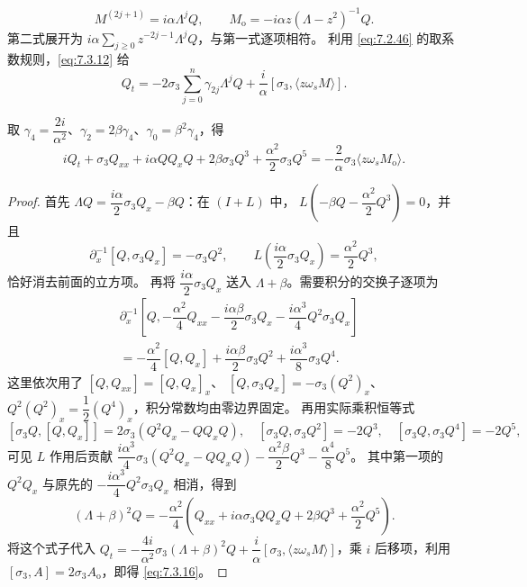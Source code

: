 \documentclass[lang=cn,scheme=chinese,mode=simple,device=normal,color=blue,math=cm,thmcnt=section,12pt]{elegantbook}
\newcommand{\eqq}[2]{\tag{#1}\label{eq:#1}#2}
\begin{document}
\begin{equation}
\eqq{7.3.15}{M^{(2j+1)}=i\alpha\Lambda^jQ,\qquad M_{\mathrm o}=-i\alpha z(\Lambda-z^2)^{-1}Q.}
\end{equation}
第二式展开为 $i\alpha\displaystyle\sum\limits_{j\ge0}z^{-2j-1}\Lambda^jQ$，与第一式逐项相符。
利用 \eqref{eq:7.2.46} 的取系数规则，\eqref{eq:7.3.12} 给
\[
Q_t=-2\sigma_3\sum\limits_{j=0}^n\gamma_{2j}\Lambda^jQ+\dfrac{i}{\alpha}[\sigma_3,\langle z\omega_sM\rangle].
\]
\setcounter{exam}{1}
\begin{example}
取 $\gamma_4=\dfrac{2i}{\alpha^2}$、$\gamma_2=2\beta\gamma_4$、$\gamma_0=\beta^2\gamma_4$，得
\begin{equation}
\eqq{7.3.16}{iQ_t+\sigma_3Q_{xx}+i\alpha QQ_xQ+2\beta\sigma_3Q^3+\dfrac{\alpha^2}{2}\sigma_3Q^5
=-\dfrac{2}{\alpha}\sigma_3\langle z\omega_sM_{\mathrm o}\rangle.}
\end{equation}
\end{example}
\begin{proof}
首先 $\Lambda Q=\dfrac{i\alpha}{2}\sigma_3Q_x-\beta Q$：在 $(I+L)$ 中，
$L(-\beta Q-\dfrac{\alpha^2}{2}Q^3)=0$，并且
\[
\partial_x^{-1}[Q,\sigma_3Q_x]=-\sigma_3Q^2,\qquad
L\left(\dfrac{i\alpha}{2}\sigma_3Q_x\right)=\dfrac{\alpha^2}{2}Q^3,
\]
恰好消去前面的立方项。
再将 $\dfrac{i\alpha}{2}\sigma_3Q_x$ 送入 $\Lambda+\beta$。需要积分的交换子逐项为
\[
\begin{aligned}
&\partial_x^{-1}\left[Q,-\dfrac{\alpha^2}{4}Q_{xx}-\dfrac{i\alpha\beta}{2}\sigma_3Q_x-\dfrac{i\alpha^3}{4}Q^2\sigma_3Q_x\right]\\
&=-\dfrac{\alpha^2}{4}[Q,Q_x]+\dfrac{i\alpha\beta}{2}\sigma_3Q^2+\dfrac{i\alpha^3}{8}\sigma_3Q^4.
\end{aligned}
\]
这里依次用了 $[Q,Q_{xx}]=[Q,Q_x]_x$、
$[Q,\sigma_3Q_x]=-\sigma_3(Q^2)_x$、
$Q^2(Q^2)_x=\dfrac{1}{2}(Q^4)_x$，积分常数均由零边界固定。
再用实际乘积恒等式
\[
[\sigma_3Q,[Q,Q_x]]=2\sigma_3(Q^2Q_x-QQ_xQ),\quad
[\sigma_3Q,\sigma_3Q^2]=-2Q^3,\quad [\sigma_3Q,\sigma_3Q^4]=-2Q^5,
\]
可见 $L$ 作用后贡献
$\dfrac{i\alpha^3}{4}\sigma_3(Q^2Q_x-QQ_xQ)-\dfrac{\alpha^2\beta}{2}Q^3-\dfrac{\alpha^4}{8}Q^5$。
其中第一项的 $Q^2Q_x$ 与原先的 $-\dfrac{i\alpha^3}{4}Q^2\sigma_3Q_x$ 相消，得到
\[
(\Lambda+\beta)^2Q=-\dfrac{\alpha^2}{4}
\left(Q_{xx}+i\alpha\sigma_3QQ_xQ+2\beta Q^3+\dfrac{\alpha^2}{2}Q^5\right).
\]
将这个式子代入 $Q_t=-\dfrac{4i}{\alpha^2}\sigma_3(\Lambda+\beta)^2Q+\dfrac{i}{\alpha}[\sigma_3,\langle z\omega_sM\rangle]$，乘 $i$ 后移项，利用 $[\sigma_3,A]=2\sigma_3A_{\mathrm o}$，即得 \eqref{eq:7.3.16}。
\end{proof}
\end{document}
